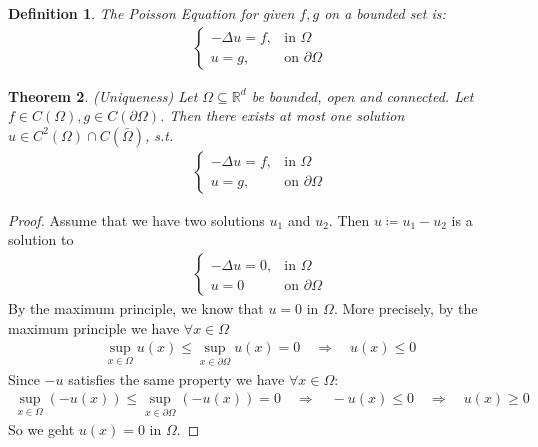 \documentclass{report}
\theoremstyle{tommy}
\newtheorem{defn}{Definition}
\newtheorem{thm}[defn]{Theorem}
\begin{document}
\begin{defn}
  The \emph{Poisson Equation} for given \(f, g\) on a bounded set is:
  \begin{align*}
    \begin{cases}
      - \Delta u = f, &\text{in } \Omega \\
      u = g, &\text{on } \partial \Omega
    \end{cases}
  \end{align*} 
\end{defn}

\begin{thm}(Uniqueness)
  Let \(\Omega \subseteq \mathbb{R}^d\) be bounded, open  and connected. Let \(f \in C(\Omega), g \in C(\partial \Omega)\). Then there exists \emph{at most} one solution \(u \in C^2(\Omega) \cap C(\bar \Omega)\), s.t. \begin{align*}
    \begin{cases}
      - \Delta u = f, &\text{in } \Omega \\
      u = g, &\text{on } \partial \Omega
    \end{cases}
  \end{align*}
\end{thm}

\begin{proof}
  Assume that we have two solutions \(u_1\) and \(u_2\). Then \(u \coloneqq u_1 - u_2\) is a solution to 
  \begin{align*}
    \begin{cases}
      - \Delta u = 0, &\text{in } \Omega \\
      u = 0 &\text{on } \partial \Omega
    \end{cases}
  \end{align*}
  By the maximum principle, we know that \(u = 0\) in \(\Omega\). More precisely, by the maximum principle we have \(\forall x \in \Omega\)
  \begin{align*}
    \sup_{x \in \Omega} u(x) \le \sup_{x \in \partial \Omega} u(x) = 0
    \quad \Rightarrow \quad
    u(x) \le 0
  \end{align*}
  Since \(-u\) satisfies the same property we have \(\forall x \in \Omega\):
  \begin{align*}
    \sup_{x \in \Omega}(-u(x)) \le \sup_{x \in \partial \Omega} (-u(x)) = 0
    \quad \Rightarrow \quad
    - u(x) \le 0
    \quad \Rightarrow \quad
    u(x) \ge 0
  \end{align*}
  So we geht \(u(x)  = 0\) in \(\Omega\).
\end{proof}
\end{document}
